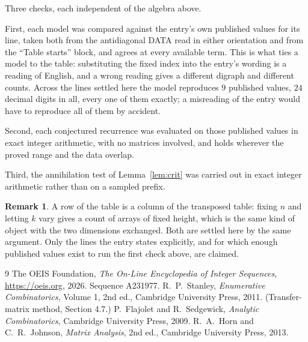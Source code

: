\documentclass[11pt,a4paper]{article}
\theoremstyle{plain}
\theoremstyle{definition}
\newtheorem{remark}[theorem]{Remark}
\begin{document}
Three checks, each independent of the algebra above.

First, each model was compared against the entry's own published values for its line, taken
both from the antidiagonal DATA read in either orientation and from the ``Table starts''
block, and agrees at every available term. This is what ties a model to the table:
substituting the fixed index into the entry's wording is a reading of English, and a wrong
reading gives a different digraph and different counts. Across the lines settled here the
model reproduces $9$ published values, $24$ decimal digits in all, every one of
them exactly; a misreading of the entry would have to reproduce all of them by accident.

Second, each conjectured recurrence was evaluated on those published values in exact
integer arithmetic, with no matrices involved, and holds wherever the proved range and the
data overlap.

Third, the annihilation test of Lemma~\ref{lem:crit} was carried out in exact integer
arithmetic rather than on a sampled prefix.

\begin{remark}
A row of the table is a column of the transposed table: fixing $n$ and letting $k$ vary gives a
count of arrays of fixed height, which is the same kind of object with the two dimensions
exchanged. Both are settled here by the same argument. Only the lines the entry states
explicitly, and for which enough published values exist to run the first check above, are
claimed.
\end{remark}

\begin{thebibliography}{9}
 The OEIS Foundation, \emph{The On-Line Encyclopedia of Integer
Sequences}, \url{https://oeis.org}, 2026. Sequence A231977.
 R.~P.~Stanley, \emph{Enumerative Combinatorics}, Volume 1, 2nd ed.,
Cambridge University Press, 2011. (Transfer-matrix method, Section 4.7.)
 P.~Flajolet and R.~Sedgewick, \emph{Analytic Combinatorics}, Cambridge
University Press, 2009.
 R.~A.~Horn and C.~R.~Johnson, \emph{Matrix Analysis}, 2nd ed., Cambridge
University Press, 2013.
\end{thebibliography}
\end{document}
